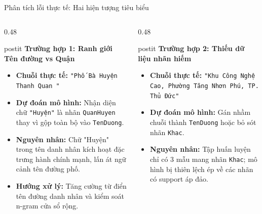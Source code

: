 \documentclass[aspectratio=169, 9pt]{beamer}
\begin{document}
\begin{frame}{Phân tích lỗi thực tế: Hai hiện tượng tiêu biểu}
  \vspace{-0.15cm}
  \begin{columns}[T]
    \begin{column}{0.48\textwidth}
      \begin{beamercolorbox}[wd=\textwidth,rounded=true,shadow=false]{postit}
        \textbf{\color{bkblue}Trường hợp 1: Ranh giới Tên đường vs Quận}
      \end{beamercolorbox}
      \vspace{0.05cm}
      {\fontsize{7.2pt}{9.2pt}\selectfont
      \begin{itemize}
        \setlength{\itemsep}{2pt}
        \item \textbf{Chuỗi thực tế:} \texttt{"Phố Bà Huyện Thanh Quan "}
        \item \textbf{Dự đoán mô hình:} Nhận diện chữ \texttt{"Huyện"} là nhãn \texttt{QuanHuyen} thay vì gộp toàn bộ vào \texttt{TenDuong}.
        \item \textbf{Nguyên nhân:} Chữ "Huyện" trong tên danh nhân kích hoạt đặc trưng hành chính mạnh, lấn át ngữ cảnh tên đường phố.
        \item \textbf{Hướng xử lý:} Tăng cường từ điển tên đường danh nhân và kiểm soát n-gram cửa sổ rộng.
      \end{itemize}
      }
    \end{column}
    \begin{column}{0.48\textwidth}
      \begin{beamercolorbox}[wd=\textwidth,rounded=true,shadow=false]{postit}
        \textbf{\color{bkblue}Trường hợp 2: Thiếu dữ liệu nhãn hiếm}
      \end{beamercolorbox}
      \vspace{0.05cm}
      {\fontsize{7.2pt}{9.2pt}\selectfont
      \begin{itemize}
        \setlength{\itemsep}{2pt}
        \item \textbf{Chuỗi thực tế:} \texttt{"Khu Công Nghệ Cao, Phường Tăng Nhơn Phú, TP. Thủ Đức"}
        \item \textbf{Dự đoán mô hình:} Gán nhầm chuỗi thành \texttt{TenDuong} hoặc bỏ sót nhãn \texttt{Khac}.
        \item \textbf{Nguyên nhân:} Tập huấn luyện chỉ có 3 mẫu mang nhãn \texttt{Khac}; mô hình bị thiên lệch ép về các nhãn có support áp đảo.

\end{itemize}}
\end{column}
\end{columns}
\end{frame}
\end{document}
